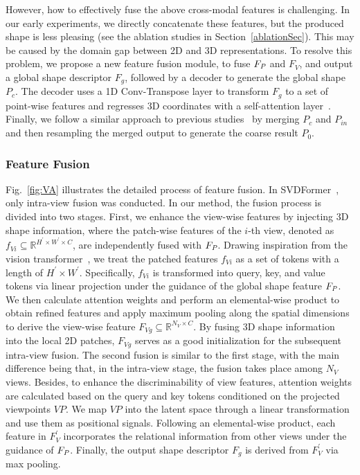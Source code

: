 However, how to effectively fuse the above cross-modal features is challenging.
In our early experiments, we directly concatenate these features, but the produced shape is less pleasing (see the ablation studies in Section~\ref{ablationSec}). This may be caused by the domain gap between 2D and 3D representations.
To resolve this problem, we propose a new feature fusion module, to fuse $F_\emph{P}$ and $F_V$, and output a global shape descriptor $F_g$, followed by a decoder to generate the global shape $P_c$. The decoder uses a 1D Conv-Transpose layer to transform $F_g$ to a set of point-wise features and regresses 3D coordinates with a self-attention layer~\citep{vaswani2017attention}.
Finally, we follow a similar approach to previous studies~\citep{9928787,zhou2022seedformer} by merging $P_c$ and $P_{in}$ and then resampling the merged output to generate the coarse result $P_0$.


\subsubsection{Feature Fusion}
Fig.~\ref{fig:VA} illustrates the detailed process of feature fusion. In SVDFormer~\citep{Zhu_2023_ICCV}, only intra-view fusion was conducted. In our method, the fusion process is divided into two stages.
First, we enhance the view-wise features by injecting 3D shape information, where the patch-wise features of the $i$-th view, denoted as  $f_{Vi}\subseteq\mathbb{R}^{H^{\prime} \times W^{\prime} \times C}$, are independently fused with $F_\emph{P}$.
Drawing inspiration from the vision transformer~\citep{dosovitskiy2021an}, we treat the patched features $f_{Vi}$ as a set of tokens with a length of $H^{\prime} \times W^{\prime}$. Specifically, $f_{Vi}$ is transformed into query, key, and value tokens via linear projection under the guidance of the global shape feature $F_\emph{P}$. We then calculate attention weights and perform an elemental-wise product to obtain refined features and apply maximum pooling along the spatial dimensions to derive the view-wise feature $F_{Vg}\subseteq\mathbb{R}^{N_V \times C}$. 
By fusing 3D shape information into the local 2D patches, $F_{Vg}$ serves as a good initialization for the subsequent intra-view fusion.
The second fusion is similar to the first stage, with the main difference being that, in the intra-view stage, the fusion takes place among $N_V$ views. Besides, to enhance the discriminability of view features, attention weights are calculated based on the query and key tokens conditioned on the projected viewpoints $VP$. We map $VP$ into the latent space through a linear transformation and use them as positional signals. Following an elemental-wise product, each feature in $F^\prime_V$ incorporates the relational information from other views under the guidance of $F_\emph{P}$.
Finally, the output shape descriptor $F_g$ is derived from $F^\prime_V$ via max pooling.

